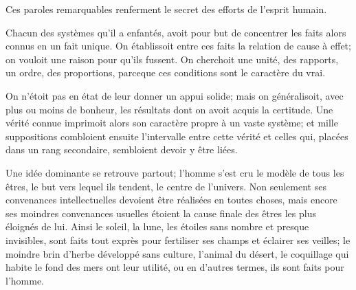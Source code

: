 \documentclass[11pt,a4paper]{article}
\begin{document}
Ces paroles remarquables renferment le secret des efforts de l'esprit
humain.

Chacun des systèmes qu'il a enfantés, avoit pour but de concentrer les
faits alors connus  en un
fait unique. On établissoit entre ces faits la relation de cause à
effet; on vouloit une raison pour qu'ils fussent. On cherchoit une
unité, des rapports, un ordre, des proportions, parceque  ces conditions sont le caractère du vrai.

 On n'étoit pas en état de leur donner un appui solide;
mais on généralisoit, avec plus ou moins de bonheur, les résultats dont
on avoit acquis la certitude. Une vérité connue imprimoit alors son
caractère propre à un vaste système; et mille suppositions combloient
ensuite l'intervalle entre cette vérité et celles qui, placées dans un
rang secondaire, sembloient devoir y être liées.

Une idée dominante se retrouve partout; l'homme s'est cru le modèle de
tous les êtres, le but vers lequel ils tendent, le centre de l'univers.
Non seulement ses convenances intellectuelles devoient être réalisées en
toutes choses, mais encore ses moindres convenances usuelles étoient la
cause finale des êtres les plus éloignés de lui. Ainsi le soleil, la
lune, les étoiles sans nombre et presque invisibles, sont faits tout
exprès pour fertiliser ses champs et éclairer ses veilles; le moindre
brin d'herbe développé sans culture, l'animal du désert, le coquillage
qui habite le fond des mers ont leur utilité, ou en d'autres termes, ils
sont faits pour l'homme.
\end{document}
